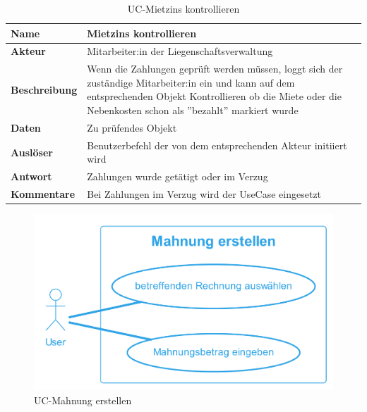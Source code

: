 \vspace*{-0.8cm}
\begin{table}[H]
  \centering
  \settowidth{}
  \setlength\extrarowheight{2pt}
  \begin{tabulary}{1.0\textwidth}{|a|m{14cm}|}
    \hline
    \textbf{Name}& Mietzins kontrollieren\\
    \hline
    \textbf{Akteur}& Mitarbeiter:in der Liegenschaftsverwaltung\\
    \hline 
    \textbf{Beschreibung} & Wenn die Zahlungen geprüft werden müssen, loggt sich der zuständige Mitarbeiter:in ein und kann auf dem entsprechenden Objekt Kontrollieren ob die Miete oder die Nebenkosten schon als ''bezahlt'' markiert wurde\\
    \hline
    \textbf{Daten} & Zu prüfendes Objekt\\
    \hline
    \textbf{Auslöser} & Benutzerbefehl der von dem entsprechenden Akteur initiiert wird\\
    \hline
    \textbf{Antwort} & Zahlungen wurde getätigt oder im Verzug\\
    \hline
    \textbf{Kommentare} & Bei Zahlungen im Verzug wird der UseCase  eingesetzt\\
    \hline
  \end{tabulary}
  \caption{UC-Mietzins kontrollieren}
\end{table}

\vspace*{-0.8cm}

\begin{figure}[H]
  \begin{center}
    \includegraphics[width=0.5\linewidth]{content/diagrams/out/usecase/mahnungGenerieren/MahnungErstellen.png}
    \caption{UC-Mahnung erstellen}
    \label{mahnung}
  \end{center}
\end{figure}

